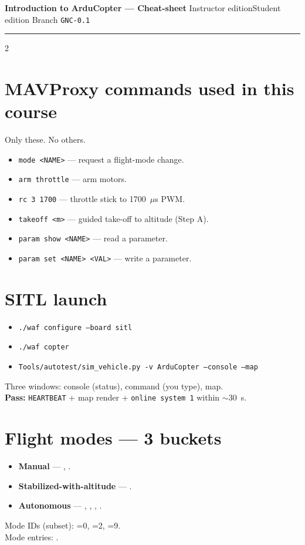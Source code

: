 \documentclass[a4paper,9pt,landscape]{extarticle}
\begin{document}
\begin{center}
  \textbf{\large Introduction to ArduCopter --- Cheat-sheet}\quad\textbar\quad
  \ifinstructor Instructor edition\else Student edition\fi\quad\textbar\quad
  Branch \texttt{GNC-0.1}\quad\textbar\quad
  \footnotesize\copyrightline
\end{center}
\hrule\medskip

\begin{multicols*}{2}

\section*{MAVProxy commands used in this course}
Only these. No others.
\begin{itemize}
  \item \texttt{mode <NAME>} --- request a flight-mode change.
  \item \texttt{arm throttle} --- arm motors.
  \item \texttt{rc 3 1700} --- throttle stick to 1700~$\mu$s PWM.
  \item \texttt{takeoff <m>} --- guided take-off to altitude (Step A).
  \item \texttt{param show <NAME>} --- read a parameter.
  \item \texttt{param set <NAME> <VAL>} --- write a parameter.
\end{itemize}

\section*{SITL launch}
\begin{itemize}
  \item \texttt{./waf configure --board sitl}
  \item \texttt{./waf copter}
  \item \texttt{Tools/autotest/sim\_vehicle.py -v ArduCopter --console --map}
\end{itemize}
Three windows: console (status), command (you type), map.\\
\textbf{Pass:} \texttt{HEARTBEAT} + map render + \texttt{online system 1} within $\sim$30~s.

\section*{Flight modes --- 3 buckets}
\begin{itemize}
  \item \textbf{Manual} --- , .
  \item \textbf{Stabilized-with-altitude} --- .
  \item \textbf{Autonomous} --- , , , .
\end{itemize}
Mode IDs (subset): =0, =2, =9.\\
Mode entries: .


\end{multicols*}
\end{document}
